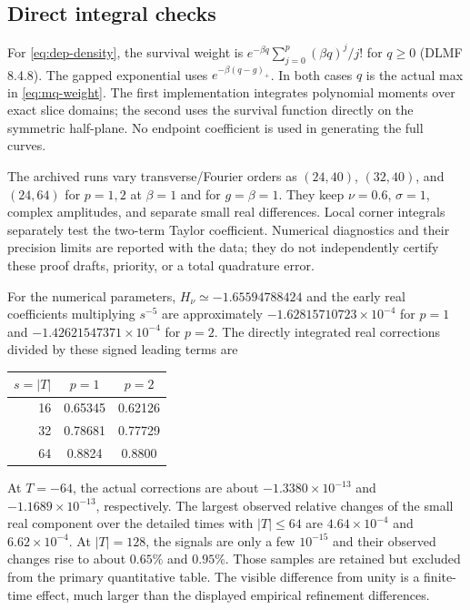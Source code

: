 \subsection{Direct integral checks}
For \eqref{eq:dep-density}, the survival weight is
$e^{-\beta q}\sum_{j=0}^p(\beta q)^j/j!$ for $q\ge0$
(DLMF 8.4.8). The gapped exponential uses
$e^{-\beta(q-g)_+}$. In both cases $q$ is the actual max in
\eqref{eq:mq-weight}. The first implementation integrates polynomial
moments over exact slice domains; the second uses the survival
function directly on the symmetric half-plane. No endpoint coefficient
is used in generating the full curves.

The archived runs vary transverse/Fourier orders as $(24,40)$,
$(32,40)$, and $(24,64)$ for $p=1,2$ at $\beta=1$ and for
$g=\beta=1$. They keep $\nu=0.6$, $\sigma=1$, complex amplitudes,
and separate small real differences. Local corner integrals separately
test the two-term Taylor coefficient. Numerical diagnostics and their
precision limits are reported with the data; they do not independently
certify these proof drafts, priority, or a total quadrature error.

For the numerical parameters, $H_\nu\simeq-1.65594788424$ and the
early real coefficients multiplying $s^{-5}$ are approximately
$-1.62815710723\times10^{-4}$ for $p=1$ and
$-1.42621547371\times10^{-4}$ for $p=2$. The directly integrated
real corrections divided by these signed leading terms are
\begin{center}
\begin{tabular}{rcc}
\toprule
$s=|T|$ & $p=1$ & $p=2$\\
\midrule
16 & 0.65345 & 0.62126\\
32 & 0.78681 & 0.77729\\
64 & 0.8824 & 0.8800\\
\bottomrule
\end{tabular}
\end{center}
At $T=-64$, the actual corrections are about
$-1.3380\times10^{-13}$ and $-1.1689\times10^{-13}$, respectively.
The largest observed relative changes of the small real component over
the detailed times with $|T|\le64$ are $4.64\times10^{-4}$ and
$6.62\times10^{-4}$. At $|T|=128$, the signals are only a few
$10^{-15}$ and their observed changes rise to about $0.65\%$ and
$0.95\%$. Those samples are retained but excluded from the primary
quantitative table. The visible difference from unity is a finite-time
effect, much larger than the displayed empirical refinement differences.


